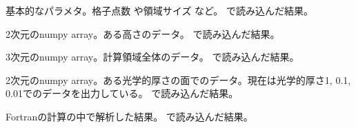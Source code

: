 \documentclass[letterpaper,10pt,dvipdfmx,report]{sphinxmanual}
\begin{document}
\begin{fulllineitems}
\label{\detokenize{io:p}}
基本的なパラメタ。格子点数  や領域サイズ  など。  で読み込んだ結果。

\end{fulllineitems}


\begin{fulllineitems}
\label{\detokenize{io:q2}}
2次元のnumpy array。ある高さのデータ。 で読み込んだ結果。

\end{fulllineitems}


\begin{fulllineitems}
\label{\detokenize{io:q3}}
3次元のnumpy array。計算領域全体のデータ。 で読み込んだ結果。

\end{fulllineitems}


\begin{fulllineitems}
\label{\detokenize{io:qi}}
2次元のnumpy array。ある光学的厚さの面でのデータ。現在は光学的厚さ1, 0.1, 0.01でのデータを出力している。  で読み込んだ結果。

\end{fulllineitems}


\begin{fulllineitems}
\label{\detokenize{io:vc}}
Fortranの計算の中で解析した結果。  で読み込んだ結果。

\end{fulllineitems}

\end{document}

